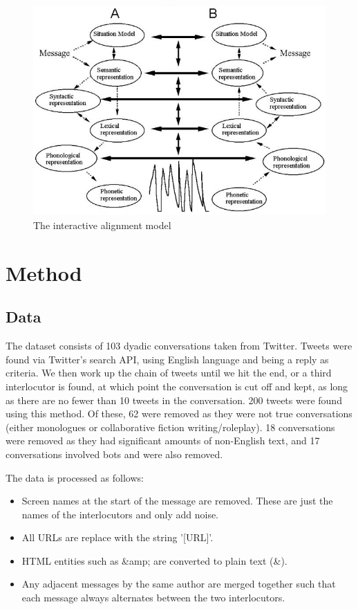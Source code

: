 \documentclass[conference]{IEEEtran}
\begin{document}
\begin{figure}
	\caption{The interactive alignment model}
	\includegraphics[width=\textwidth]{iam}
\end{figure}


\section{Method}

\subsection{Data}
The dataset consists of 103 dyadic conversations taken from Twitter. Tweets were found via Twitter's 
search API, using English language and being a reply as criteria. We then work up the chain of tweets 
until we hit the end, or a third interlocutor is found, at which point the conversation is cut off and 
kept, as long as there are no fewer than 10 tweets in the conversation. 200 tweets were found using 
this method. Of these, 62 were removed as they were not true conversations (either monologues or 
collaborative fiction writing/roleplay). 18 conversations were removed as they had significant amounts 
of non-English text, and 17 conversations involved bots and were also removed.

The data is processed as follows:
\begin{itemize}
	\item Screen names at the start of the message are removed. These are just the names of the 
		  interlocutors and only add noise.
	\item All URLs are replace with the string '[URL]'.
	\item HTML entities such as \&amp; are converted to plain text (\&).
	\item Any adjacent messages by the same author are merged together such that each message always
	      alternates between the two interlocutors.
\end{itemize}
\end{document}
